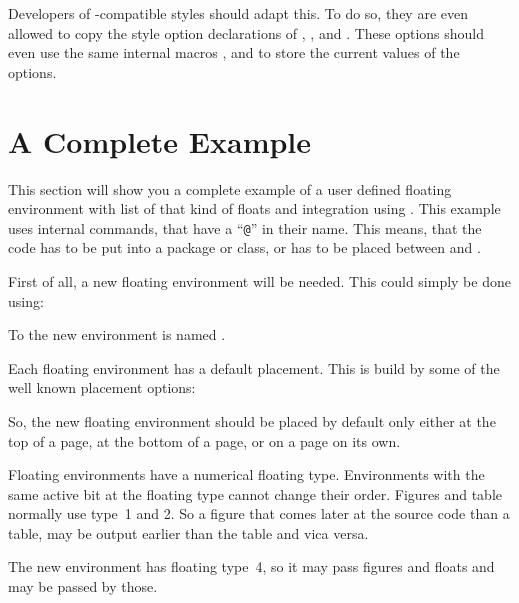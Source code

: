 Developers of -compatible styles should adapt this. To do so,
they are even allowed to copy the style option declarations of
, , and
. These options should even use the same internal
macros ,
 and
 to store the current
values of the options.%
\EndIndexGroup


\section{A Complete Example}

This section will show you a complete example of a user defined floating
environment with list of that kind of floats and \KOMAScript{} integration
using . This example uses internal commands, that have a
``\texttt{@}'' in their name. This means, that the code
has to be put into a package or class, or has to be placed between
%
 and .

First of all, a new floating environment will be
needed. This could simply be done using:
\begin{lstcode}
  \newenvironment{remarkbox}{%
    \@float{remarkbox}%
  }{%
    \end@float
  }
\end{lstcode}
To the new environment is named .

Each floating environment has a default
placement. This is build by some of the well known placement options:
\begin{lstcode}
  \newcommand*{\fps@remarkbox}{tbp}
\end{lstcode}
So, the new floating environment should be placed by default only either at
the top of a page, at the bottom of a page, or on a page on its own.

Floating environments have a numerical floating
type. Environments with the same active bit at the floating type cannot change
their order. Figures and table normally use type~1 and 2. So a figure that
comes later at the source code than a table, may be output earlier than the
table and vica versa.
\begin{lstcode}
  \newcommand*{\ftype@remarkbox}{4}
\end{lstcode}
The new environment has floating type~4, so it may pass figures and floats and
may be passed by those.

